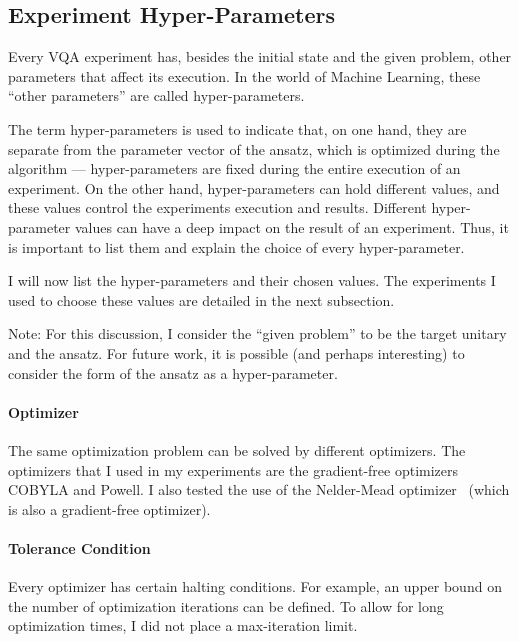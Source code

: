 \documentclass[a4paper,12pt]{article}
\begin{document}
\subsection{Experiment Hyper-Parameters} \label{subsec:hyperparams}
Every VQA experiment has, besides the initial state and the given problem, other parameters that affect its execution.
In the world of Machine Learning, these ``other parameters'' are called hyper-parameters.

The term hyper-parameters is used to indicate that, on one hand, they are separate from the parameter vector of the ansatz, which is optimized during the algorithm --- hyper-parameters are fixed during the entire execution of an experiment.
On the other hand, hyper-parameters can hold different values, and these values control the experiments execution and results. Different hyper-parameter values can have a deep impact on the result of an experiment.
Thus, it is important to list them and explain the choice of every hyper-parameter.

I will now list the hyper-parameters and their chosen values.
The experiments I used to choose these values are detailed in the next subsection.

Note: For this discussion, I consider the ``given problem'' to be the target unitary and the ansatz.
For future work, it is possible (and perhaps interesting) to consider the form of the ansatz as a hyper-parameter.

\paragraph*{Optimizer}
The same optimization problem can be solved by different optimizers.
The optimizers that I used in my experiments are the gradient-free optimizers COBYLA and Powell. I also tested the use of the Nelder-Mead optimizer~\cite{Nelder-Mead} (which is also a gradient-free optimizer).

\paragraph*{Tolerance Condition}
Every optimizer has certain halting conditions.
For example, an upper bound on the number of optimization iterations can be defined.
To allow for long optimization times, I did not place a max-iteration limit.
\end{document}
